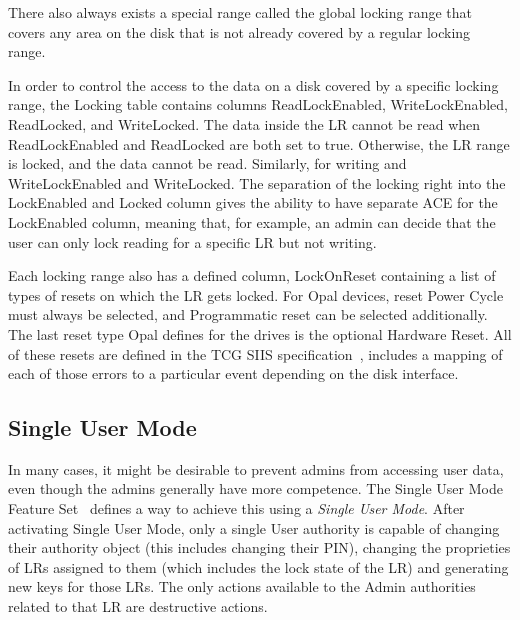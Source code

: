 There also always exists a special range called the global locking range that covers any area on the disk that is not already covered by a regular locking range.

In order to control the access to the data on a disk covered by a specific locking range, the Locking table contains columns ReadLockEnabled, WriteLockEnabled, ReadLocked, and WriteLocked. The data inside the LR cannot be read when ReadLockEnabled and ReadLocked are both set to true. Otherwise, the LR range is locked, and the data cannot be read. Similarly, for writing and WriteLockEnabled and WriteLocked. The separation of the locking right into the LockEnabled and Locked column gives the ability to have separate ACE for the LockEnabled column, meaning that, for example, an admin can decide that the user can only lock reading for a specific LR but not writing. 

Each locking range also has a defined column, LockOnReset containing a list of types of resets on which the LR gets locked. 
For Opal devices, reset Power Cycle must always be selected, and Programmatic reset can be selected additionally. The last reset type Opal defines for the drives is the optional Hardware Reset. All of these resets are defined in the TCG SIIS specification~\cite{tcg-siis}, includes a mapping of each of those errors to a particular event depending on the disk interface.

\subsection{Single User Mode}

In many cases, it might be desirable to prevent admins from accessing user data, even though the admins generally have more competence. 
The Single User Mode Feature Set~\cite{tcg-sum} defines a way to achieve this using a \emph{Single User Mode}.
After activating Single User Mode, only a single User authority is capable of changing their authority object (this includes changing their PIN), changing the proprieties of LRs assigned to them (which includes the lock state of the LR) and generating new keys for those LRs.
The only actions available to the Admin authorities related to that LR are destructive actions.

